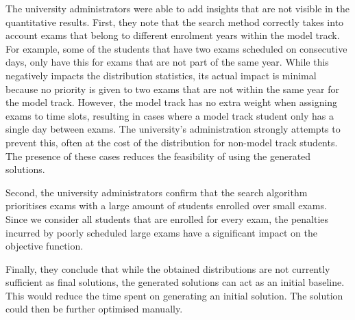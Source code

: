The university administrators were able to add insights that are not visible in the quantitative results. First, they note that the search method correctly takes into account exams that belong to different enrolment years within the model track. For example, some of the students that have two exams scheduled on consecutive days, only have this for exams that are not part of the same year. While this negatively impacts the distribution statistics, its actual impact is minimal because no priority is given to two exams that are not within the same year for the model track. However, the model track has no extra weight when assigning exams to time slots, resulting in cases where a model track student only has a single day between exams. The university's administration strongly attempts to prevent this, often at the cost of the distribution for non-model track students. The presence of these cases reduces the feasibility of using the generated solutions.

Second, the university administrators confirm that the search algorithm prioritises exams with a large amount of students enrolled over small exams. Since we consider all students that are enrolled for every exam, the penalties incurred by poorly scheduled large exams have a significant impact on the objective function. 

Finally, they conclude that while the obtained distributions are not currently sufficient as final solutions, the generated solutions can act as an initial baseline. This would reduce the time spent on generating an initial solution. The solution could then be further optimised manually.


